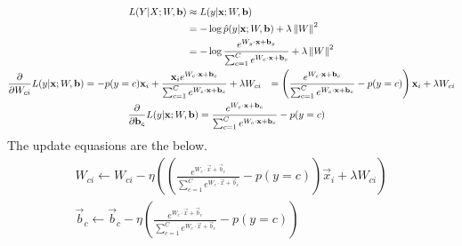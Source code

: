 \documentclass{introtosml}
\newcommand{\x}{\vec{x}}
\newcommand{\bb}{\vec{b}}
\begin{document}
\begin{p}
  \item
    \begin{gather*}
      \begin{aligned}
        L(Y|X; W, \bb)
        & \approx L(y|\x; W, \bb) \\
        & = - \log \hat{p}(y|\x; W, \bb) + \lambda \norm{W}^2 \\
        & = - \log \frac{e^{W_y \cdot \x + \bb_y}}{\sum_{c=1}^C e^{W_c \cdot \x + \bb_c}}
            + \lambda \norm{W}^2
      \end{aligned} \\
      \begin{aligned}
        \frac{\partial}{\partial W_{ci}} L(y|\x; W, \bb)
        & = - p(y=c) \x_i + \frac{\x_i e^{W_c \cdot \x + \bb_c}}
                                 {\sum_{c=1}^C e^{W_c \cdot \x + \bb_c}}
            + \lambda W_{ci}
        & = \left(\frac{e^{W_c \cdot \x + \bb_c}}{\sum_{c=1}^C e^{W_c \cdot \x + \bb_c}}
            - p(y=c)\right) \x_i + \lambda W_{ci}
      \end{aligned} \\
      \begin{aligned}
        \frac{\partial}{\partial \bb_{c}} L(y|\x; W, \bb)
        & = \frac{e^{W_c \cdot \x + \bb_c}}{\sum_{c=1}^C e^{W_c \cdot \x + \bb_c}} - p(y=c)
      \end{aligned} \\
    \end{gather*}
    \therefore The update equasions are the below.
    \begin{gather*}
      W_{ci} \leftarrow W_{ci} - \eta
      \left(\left(\frac{e^{W_c \cdot \x + \bb_c}}{\sum_{c=1}^C e^{W_c \cdot \x + \bb_c}}
            - p(y=c)\right) \x_i + \lambda W_{ci}\right) \\
      \bb_c \leftarrow \bb_c - \eta
      \left( \frac{e^{W_c \cdot \x + \bb_c}}
                  {\sum_{c=1}^C e^{W_c \cdot \x + \bb_c}} - p(y=c)\right)
    \end{gather*}
\end{p}
\end{document}
